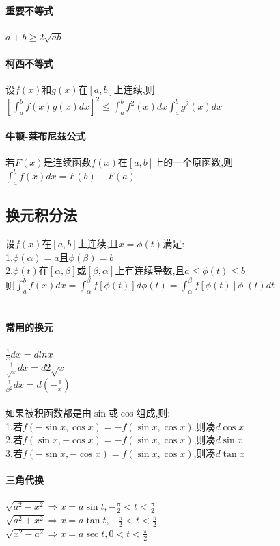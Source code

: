 \documentclass{article}
\begin{document}
\begin{flushleft}
	\paragraph{重要不等式}
	$a+b\ge 2\sqrt{ab}$\\
	\paragraph{柯西不等式}
	设$f(x)$和$g(x)$在$[a,b]$上连续,则$[\int_{a}^{b}f(x)g(x)dx]^2\le \int_{a}^{b}f^2(x)dx\int_{a}^{b}g^2(x)dx$\\
	\paragraph{牛顿-莱布尼兹公式}
	若$F(x)$是连续函数$f(x)$在$[a,b]$上的一个原函数,则$\int_{a}^{b}f(x)dx=F(b)-F(a)$\\
	
	\subsection{换元积分法}
	
	设$f(x)$在$[a,b]$上连续,且$x=\phi(t)$满足:\\
	1.$\phi(\alpha)=a$且$\phi(\beta)=b$\\
	2.$\phi(t)$在$[\alpha,\beta]$或$[\beta,\alpha]$上有连续导数,且$a\le \phi(t)\le b$\\
	则$\int_{a}^{b}f(x)dx=\int_{\alpha}^{\beta}f[\phi(t)]d\phi(t)=\int_{\alpha}^{\beta}f[\phi(t)]\phi^{'}(t)dt$\\
	~\\
	\paragraph{常用的换元}
	$\frac{1}{x}dx=dlnx$\\
	$\frac{1}{\sqrt{x}}dx=d2\sqrt{x}$\\
	$\frac{1}{x^2}dx=d(-\frac{1}{x})$\\
	~\\
	如果被积函数都是由$\sin$或$\cos$组成,则:\\
	1.若$f(-\sin x,\cos x)=-f(\sin x,\cos x)$,则凑$d\cos x$\\
	2.若$f(\sin x,-\cos x)=-f(\sin x,\cos x)$,则凑$d\sin x$\\
	3.若$f(-\sin x,-\cos x)=f(\sin x,\cos x)$,则凑$d\tan x$\\
	\paragraph{三角代换}
	$\sqrt{a^2-x^2} \Rightarrow x=a\sin t, -\frac{\pi}{2}<t<\frac{\pi}{2}$\\
	$\sqrt{a^2+x^2} \Rightarrow x=a\tan t, -\frac{\pi}{2}<t<\frac{\pi}{2}$\\
	$\sqrt{x^2-a^2} \Rightarrow x=a\sec t, 0<t<\frac{\pi}{2}$\\

\end{flushleft}
\end{document}

